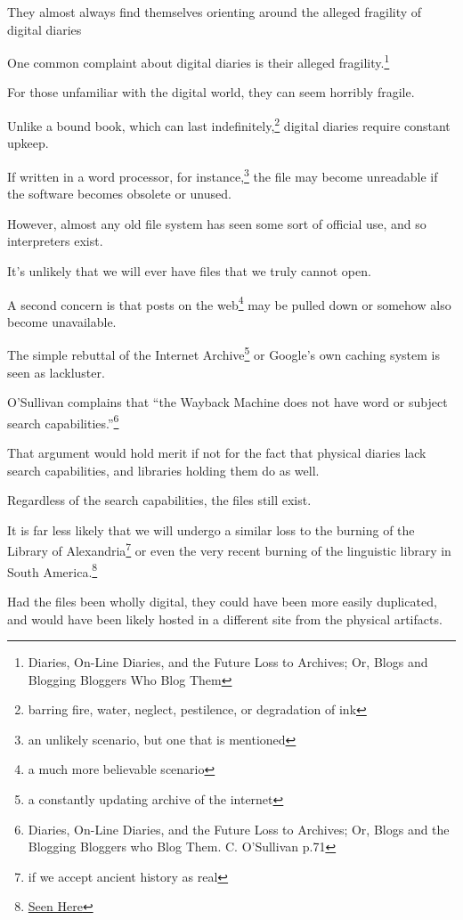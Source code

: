 \documentclass[12pt]{article}[titlepage]
\newcommand{\say}[1]{``#1''}
\newcommand{\1}{\={a}}
\newcommand{\2}{\={e}}
\newcommand{\3}{\={\i}}
\newcommand{\4}{\=o}
\newcommand{\5}{\=u}
\newcommand{\6}{\={A}}
\renewcommand{\,}{\textsuperscript{,}}
\begin{document}
They almost always find themselves orienting around the alleged fragility of digital diaries


One common complaint about digital diaries is their alleged fragility.\footnote{Diaries, On-Line Diaries, and the Future Loss to Archives; Or, Blogs and Blogging Bloggers Who Blog Them}

For those unfamiliar with the digital world, they can seem horribly fragile.

Unlike a bound book, which can last indefinitely,\footnote{barring fire, water, neglect, pestilence, or degradation of ink} digital diaries require constant upkeep.

If written in a word processor, for instance,\footnote{an unlikely scenario, but one that is mentioned} the file may become unreadable if the software becomes obsolete or unused.

However, almost any old file system has seen some sort of official use, and so interpreters exist.

It’s unlikely that we will ever have files that we truly cannot open.


A second concern is that posts on the web\footnote{a much more believable scenario} may be pulled down or somehow also become unavailable.

The simple rebuttal of the Internet Archive\footnote{a constantly updating archive of the internet} or Google’s own caching system is seen as lackluster.

O’Sullivan complains that \say{the Wayback Machine does not have word or subject search capabilities.}\footnote{Diaries, On-Line Diaries, and the Future Loss to Archives; Or, Blogs and the Blogging Bloggers who Blog Them. C. O’Sullivan p.71}

That argument would hold merit if not for the fact that physical diaries lack search capabilities, and libraries holding them do as well.

Regardless of the search capabilities, the files still exist.

It is far less likely that we will undergo a similar loss to the burning of the Library of Alexandria\footnote{if we accept ancient history as real} or even the very recent burning of the linguistic library in South America.\footnote{\href{https://www.nationalgeographic.com/science/2018/09/news-museu-nacional-fire-rio-de-janeiro-natural-history/}{Seen Here}}

Had the files been wholly digital, they could have been more easily duplicated, and would have been likely hosted in a different site from the physical artifacts.
\end{document}
